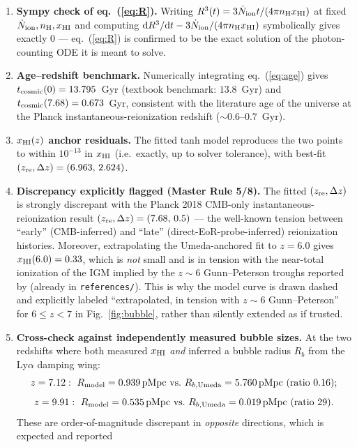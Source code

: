 \documentclass[11pt,a4paper]{article}
\newcommand{\Ndot}{\dot{N}_{\rm ion}}
\newcommand{\nH}{n_{\rm H}}
\newcommand{\pMpc}{\,{\rm pMpc}}
\begin{document}
\begin{enumerate}
\item \textbf{Sympy check of eq.~(\ref{eq:R}).} Writing $R^3(t)=3\Ndot t/(4\pi\nH x_{\rm HI})$ at fixed
      $\Ndot,\nH,x_{\rm HI}$ and computing $\mathrm{d}R^3/\mathrm{d}t - 3\Ndot/(4\pi\nH x_{\rm HI})$
      symbolically gives exactly $0$ — eq.~(\ref{eq:R}) is confirmed to be the exact solution of the
      photon-counting ODE it is meant to solve.
\item \textbf{Age--redshift benchmark.} Numerically integrating eq.~(\ref{eq:age}) gives
      $t_{\rm cosmic}(0)=13.795$~Gyr (textbook benchmark: $13.8$~Gyr) and
      $t_{\rm cosmic}(7.68)=0.673$~Gyr, consistent with the literature age of the universe at the Planck
      instantaneous-reionization redshift ($\sim0.6$--$0.7$~Gyr).
\item \textbf{$x_{\rm HI}(z)$ anchor residuals.} The fitted tanh model reproduces the two \citet{Umeda2023}
      points to within $10^{-13}$ in $x_{\rm HI}$ (i.e.\ exactly, up to solver tolerance), with best-fit
      $(z_{\rm re},\Delta z)=(6.963,\,2.624)$.
\item \textbf{Discrepancy explicitly flagged (Master Rule 5/8).} The fitted $(z_{\rm re},\Delta z)$ is
      strongly discrepant with the Planck 2018 CMB-only instantaneous-reionization result
      $(z_{\rm re},\Delta z)=(7.68,\,0.5)$ \citep{Planck2018VI} — the well-known tension between
      ``early'' (CMB-inferred) and ``late'' (direct-EoR-probe-inferred) reionization histories. Moreover,
      extrapolating the Umeda-anchored fit to $z=6.0$ gives $x_{\rm HI}(6.0)=0.33$, which is \emph{not}
      small and is in tension with the near-total ionization of the IGM implied by the $z\sim6$
      Gunn--Peterson troughs reported by \citet{White2003} (already in \texttt{references/}). This is why
      the model curve is drawn dashed and explicitly labeled ``extrapolated, in tension with $z\sim6$
      Gunn--Peterson'' for $6\le z<7$ in Fig.~\ref{fig:bubble}, rather than silently extended as if trusted.
\item \textbf{Cross-check against independently measured bubble sizes.} At the two redshifts where
      \citet{Umeda2023} both measured $x_{\rm HI}$ \emph{and} inferred a bubble radius $R_b$ from the
      Ly$\alpha$ damping wing:
      \[
        z=7.12:\ R_{\rm model}=0.939\pMpc \ \text{vs.}\ R_{b,\rm Umeda}=5.760\pMpc \ (\text{ratio } 0.16);
      \]
      \[
        z=9.91:\ R_{\rm model}=0.535\pMpc \ \text{vs.}\ R_{b,\rm Umeda}=0.019\pMpc \ (\text{ratio } 29).
      \]
      These are order-of-magnitude discrepant in \emph{opposite} directions, which is expected and reported

\end{enumerate}
\end{document}
